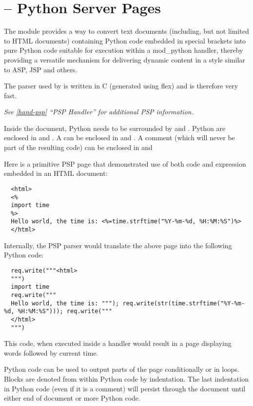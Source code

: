 \section{ -- Python Server Pages\label{pyapi-psp}}

The  module provides a way to convert text documents
(including, but not limited to HTML documents) containing Python code
embedded in special brackets into pure Python code suitable for
execution within a mod_python handler, thereby providing a versatile
mechanism for delivering dynamic content in a style similar to ASP,
JSP and others.

The parser used by  is written in C (generated using flex)
and is therefore very fast.

\emph{See \ref{hand-psp} ``PSP Handler'' for additional PSP
information.}

Inside the document, Python  needs to be surrounded by
\samp{<\%} and \samp{\%>}. Python  are enclosed in
\samp{<\%=} and \samp{\%>}. A  can be enclosed in
 and \samp{\%>}. A comment (which will never be part of
the resulting code) can be enclosed in \samp{<\%--} and \samp{--\%>}

Here is a primitive PSP page that demonstrated use of both code and
expression embedded in an HTML document:

\begin{verbatim}
  <html>
  <%
  import time
  %>
  Hello world, the time is: <%=time.strftime("%Y-%m-%d, %H:%M:%S")%>
  </html>
\end{verbatim}

Internally, the PSP parser would translate the above page into the
following Python code:

\begin{verbatim}
  req.write("""<html>
  """)
  import time
  req.write("""
  Hello world, the time is: """); req.write(str(time.strftime("%Y-%m-%d, %H:%M:%S"))); req.write("""
  </html>
  """)
\end{verbatim}

This code, when executed inside a handler would result in a page
displaying words  followed by current time.

Python code can be used to output parts of the page conditionally or
in loops. Blocks are denoted from within Python code by
indentation. The last indentation in Python code (even if it is a
comment) will persist through the document until either end of
document or more Python code.

